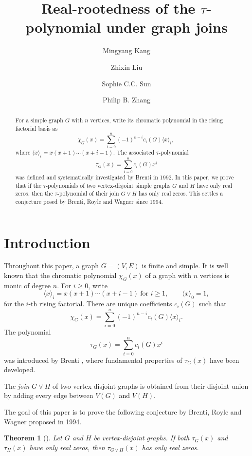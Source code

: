 \documentclass[12pt,a4paper,reqno]{amsart}
\title[Real-rootedness of $\tau$ under graph joins]
{Real-rootedness of the $\tau$-polynomial under graph joins}
\author{Mingyang Kang}
\author{Zhixin Liu}
\author{Sophie C.C. Sun}
\author{Philip B. Zhang}
\numberwithin{equation}{section}
\newtheorem{theorem}{Theorem}[section]
\theoremstyle{definition}
\theoremstyle{remark}
\begin{document}
\begin{abstract}
For a simple graph $G$ with $n$ vertices, write its chromatic polynomial in
 the rising factorial basis as
\[
 \chi_G(x)=\sum_{i=0}^{n}(-1)^{n-i}c_i(G)\langle x\rangle_i,
 \
\]
where $ \langle x\rangle_i=x(x+1)\cdots(x+i-1).$ The associated $\tau$-polynomial 
\[
 \tau_G(x)=\sum_{i=0}^{n}c_i(G)x^i
\]
  was defined and  systematically investigated by Brenti in 1992. In this paper, we
prove that if the $\tau$-polynomials of two vertex-disjoint simple graphs
$G$ and $H$ have only real zeros, then the $\tau$-polynomial of their join
$G\vee H$ has only real zeros. This settles  a conjecture posed by Brenti, Royle 
and Wagner since  1994.
\end{abstract}

\maketitle

\section{Introduction}\label{sec:introduction}

Throughout this paper, a graph $G=(V,E)$ is finite and simple.  It is well known that the
chromatic polynomial $\chi_G(x)$ of a graph with $n$ vertices is monic of
degree $n$.  For $i\geq0$, write
\[
 \langle x\rangle_i=x(x+1)\cdots(x+i-1)\ \text{for $i\geq 1$},
 \qquad \langle x\rangle_0=1,
\]
for the $i$-th rising factorial.  There are unique coefficients $c_i(G)$
such that
\begin{equation*}
 \chi_G(x)=\sum_{i=0}^{n}(-1)^{n-i}c_i(G)\langle x\rangle_i.
\end{equation*}
The polynomial
\[
\tau_G(x)=\sum_{i=0}^{n}c_i(G)x^i
\]
was introduced by Brenti \cite[Section~5]{Brenti92}, where fundamental  properties of $\tau_G(x)$ have been developed.

The \emph{join} $G\vee H$ of two vertex-disjoint graphs is obtained from
their disjoint union by adding every edge between $V(G)$ and $V(H)$.  

The goal of this paper is to 
prove the following conjecture by Brenti, Royle and Wagner {\cite{BRW94}} proposed in 1994.

\begin{theorem}[{\cite[Conjecture~6.6]{BRW94}}]\label{thm:graph-join}
Let $G$ and $H$ be vertex-disjoint graphs.  If both $\tau_G(x)$ and
$\tau_H(x)$ have only real zeros, then $\tau_{G\vee H}(x)$ has only real
zeros.
\end{theorem}
\end{document}
